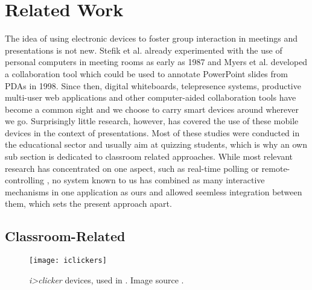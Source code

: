 \chapter{Related Work}
\label{cha:related-work}

The idea of using electronic devices to foster group interaction in meetings and presentations is not new. Stefik et al. \cite{Stefik:BeyondTheChalkboard} already experimented with the use of personal computers in meeting rooms as early as 1987 and Myers et al. \cite{Myers:CollaborationPDAs} developed a collaboration tool which could be used to annotate PowerPoint slides from PDAs in 1998. Since then, digital whiteboards, telepresence systems, productive multi-user web applications and other computer-aided collaboration tools have become a common sight and we choose to carry smart devices around wherever we go. Surprisingly little research, however, has covered the use of these mobile devices in the context of presentations. Most of these studies were conducted in the educational sector and usually aim at quizzing students, which is why an own sub section is dedicated to classroom related approaches. While most relevant research has concentrated on one aspect, such as real-time polling \cite{Inoue:RealTimeQuestionnaire} or remote-controlling \cite{Chattopadhyay:OfficeSocialRemoteControl}, no system known to us has combined as many interactive mechanisms in one application as ours and allowed seemless integration between them, which sets the present approach apart.

\section{Classroom-Related}
\label{sec:related-work-classroom}

\begin{figure}
\centering
\texttt{[image: iclickers]}
\caption{\emph{i>clicker} devices, used in \cite{Chamillard:StudentResponseSystem}. Image source \cite{iclicker}.}
\label{fig:related-work-iclicker}
\end{figure}

